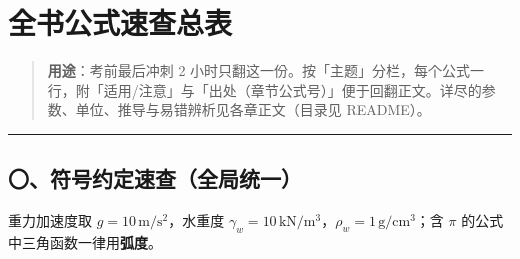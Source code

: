 \documentclass[
]{article}
\author{}
\date{}
\begin{document}
\section{全书公式速查总表}\label{ux5168ux4e66ux516cux5f0fux901fux67e5ux603bux8868}

\begin{quote}
\textbf{用途}：考前最后冲刺 2
小时只翻这一份。按「主题」分栏，每个公式一行，附「适用/注意」与「出处（章节公式号）」便于回翻正文。详尽的参数、单位、推导与易错辨析见各章正文（目录见
README）。
\end{quote}

\begin{center}\rule{0.5\linewidth}{0.5pt}\end{center}

\subsection{〇、符号约定速查（全局统一）}\label{ux7b26ux53f7ux7ea6ux5b9aux901fux67e5ux5168ux5c40ux7edfux4e00}

重力加速度取 \(g=10\,\mathrm{m/s^2}\)，水重度
\(\gamma_w=10\,\mathrm{kN/m^3}\)，\(\rho_w=1\,\mathrm{g/cm^3}\)；含
\(\pi\) 的公式中三角函数一律用\textbf{弧度}。
\end{document}
